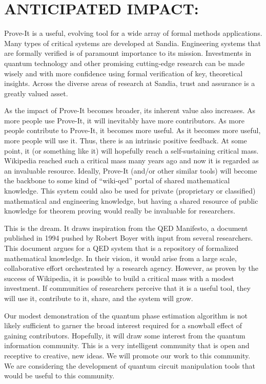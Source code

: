 \documentclass{article}[12pt]
\begin{document}
\section*{ANTICIPATED IMPACT:}

Prove-It is a useful, evolving tool for a wide array of formal methods applications.  Many types of critical systems are developed at Sandia.  Engineering systems that are formally verified is of paramount importance to its mission.  Investments in quantum technology and other promising cutting-edge research can be made wisely and with more confidence using formal verification of key, theoretical insights.  Across the diverse areas of research at Sandia, trust and assurance is a greatly valued asset.

As the impact of Prove-It becomes broader, its inherent value also increases.  As more people use Prove-It, it will inevitably have more contributors.  As more people contribute to Prove-It, it becomes more useful.  As it becomes more useful, more people will use it.  Thus, there is an intrinsic positive feedback.  At some point, it (or something like it) will hopefully reach a self-sustaining critical mass.  Wikipedia reached such a critical mass many years ago and now it is regarded as an invaluable resource.  Ideally, Prove-It (and/or other similar tools) will become the backbone to some kind of ``wiki-qed'' portal of shared mathematical knowledge.  This system could also be used for private (proprietary or classified) mathematical and engineering knowledge, but having a shared resource of public knowledge for theorem proving would really be invaluable for researchers.

This is the dream.  It draws inspiration from the QED Manifesto, a document published in 1994 pushed by Robert Boyer with input from several researchers.  This document argues for a QED system that is a repository of formalized mathematical knowledge.  In their vision, it would arise from a large scale, collaborative effort orchestrated by a research agency.  However, as proven by the success of Wikipedia, it is possible to build a critical mass with a modest investment.  If communities of researchers perceive that it is a useful tool, they will use it, contribute to it, share, and the system will grow.

Our modest demonstration of the quantum phase estimation algorithm is not likely sufficient to garner the broad interest required for a snowball effect of gaining contributors.  Hopefully, it will draw some interest from the quantum information community.  This is a very intelligent community that is open and receptive to creative, new ideas.  We will promote our work to this community.  We are considering the development of quantum circuit manipulation tools that would be useful to this community.
\end{document}
